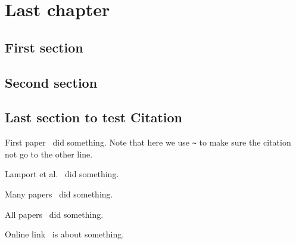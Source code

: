 \chapter{Last chapter}
\lipsum[1]
\section{First section} 
\lipsum[2-3]


\section{Second section} 
\lipsum[4-5]

\section{Last section to test Citation} 

First paper~\cite{goossens1994latex} did something. Note that here we use \verb|~| to make sure the citation not go to the other line. 

Lamport et al.~\cite{lamport1994latex} did something.

Many papers~\cite{makuuchi2000progress,yassin1994latex} did something.


All papers~\cite{makuuchi2000progress,yassin1994latex,
	goossens1994latex,lamport1994latex} did something.

Online link~\cite{onlineWindows} is about something.
